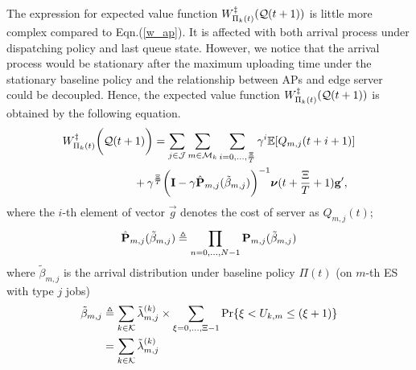 The expression for expected value function $W^{\ddagger}_{\Pi_{k}(t)}(\mathcal{Q}(t+1))$ is little more complex compared to Eqn.(\ref{w_ap}).
It is affected with both arrival process under dispatching policy and last queue state.
However, we notice that the arrival process would be stationary after the maximum uploading time under the stationary baseline policy and the relationship between APs and edge server could be decoupled.
Hence, the expected value function $W^{\ddagger}_{\Pi_{k}(t)}(\mathcal{Q}(t+1))$ is obtained by the following equation.
\begin{align}
    &W^{\ddagger}_{\Pi_{k}(t)}\bigg(\mathcal{Q}(t+1)\bigg)
    = \sum_{j\in\mathcal{J}}\sum_{m\in\mathcal{M}_{k}}\sum_{i=0,\dots,\frac{\Xi}{T}} \gamma^{i} \mathbb{E}[ Q_{m,j}({t+i+1}) ]
    \nonumber\\
    &~~~~~~~~~~~~~~~~~~~+ \gamma^{\frac{\Xi}{T}} \bigg( \mathbf{I} - \gamma \hat{\mathbf{P}}_{m,j}(\tilde{\beta}_{m,j}) \bigg)^{-1} \boldsymbol{\nu}({t+\frac{\Xi}{T}+1}) \mathbf{g}',
\end{align}
where the $i$-th element of vector $\vec{g}$ denotes the cost of server as $Q_{m,j}(t)$;
\begin{align}
    \hat{\mathbf{P}}_{m,j}(\tilde{\beta}_{m,j}) \triangleq \prod_{n=0,\dots,N-1} \mathbf{P}_{m,j}(\tilde{\beta}_{m,j})
\end{align}
where $\tilde{\beta}_{m,j}$ is the arrival distribution under baseline policy $\Pi(t)$ (on $m$-th ES with type $j$ jobs)
\begin{align}
    \tilde{\beta}_{m,j} &\triangleq \sum_{k\in\mathcal{K}} \tilde{\lambda}^{(k)}_{m,j} \times \sum_{\xi=0,\dots,\Xi-1} \Pr\{ \xi<U_{k,m}\leq(\xi+1) \}
        \nonumber\\
    ~~~~&= \sum_{k\in\mathcal{K}} \tilde{\lambda}^{(k)}_{m,j}
\end{align}

